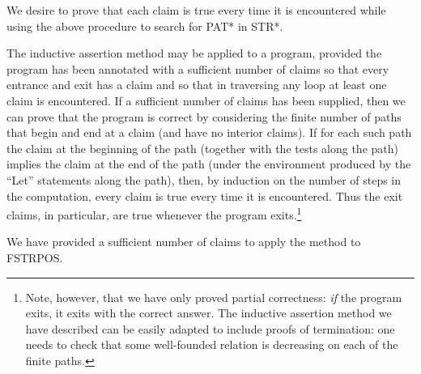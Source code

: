 \documentclass[11pt]{book}
\newcommand{\pubinlineunderline}[1]{\emph{#1}}
\begin{document}
We desire to prove that each claim is true every time it is encountered
while using the above procedure to search for PAT* in STR*.

The inductive assertion method may be applied to a program, provided the
program has been annotated with a sufficient number of claims so that
every entrance and exit has a claim and so that in traversing
any loop at least one claim is encountered.  If a sufficient
number of claims has been supplied, then we can prove that the program
is correct by considering the finite number of paths that begin and end at a
claim (and have no interior claims).  If for each such path
the claim at the beginning of the path (together with the
tests along the path) implies the claim at the end of the path
(under the environment produced by the ``Let'' statements
along the path), then, by induction on the number of steps
in the computation, every claim is true every time it is encountered.
Thus the exit claims, in particular, are true whenever the
program exits.\footnote{Note, however, that we have only proved partial correctness:  \pubinlineunderline{if} the program exits, it exits with the correct answer.  The inductive assertion method we have described can be easily adapted to include proofs of termination:  one needs to check that some well-founded relation is decreasing on each of the finite paths.}

We have provided a sufficient number of claims to apply the method
to FSTRPOS.
\end{document}
